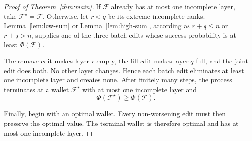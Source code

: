 \documentclass[11pt]{article}
\newcommand{\cF}{\mathcal F}
\newcommand{\1}{\mathbf 1}
\begin{document}
\begin{proof}[Proof of Theorem~\ref{thm:main}]
If $\cF$ already has at most one incomplete layer, take
$\cF^\star=\cF$.  Otherwise, let $r<q$ be its extreme incomplete
ranks.  Lemma~\ref{lem:low-sum} or Lemma~\ref{lem:high-sum}, according
as $r+q\leq n$ or $r+q>n$, supplies one of the three batch edits whose
success probability is at least $\Phi(\cF)$.

The remove edit makes layer $r$ empty, the fill edit makes layer $q$
full, and the joint edit does both.  No other layer changes.  Hence
each batch edit eliminates at least one incomplete layer and creates
none.  After finitely many steps, the process terminates at a wallet
$\cF^\star$ with at most one incomplete layer and
\[
\Phi(\cF^\star)\geq\Phi(\cF).
\]

Finally, begin with an optimal wallet.  Every non-worsening edit must
then preserve the optimal value.  The terminal wallet is therefore
optimal and has at most one incomplete layer.
\end{proof}
\end{document}
